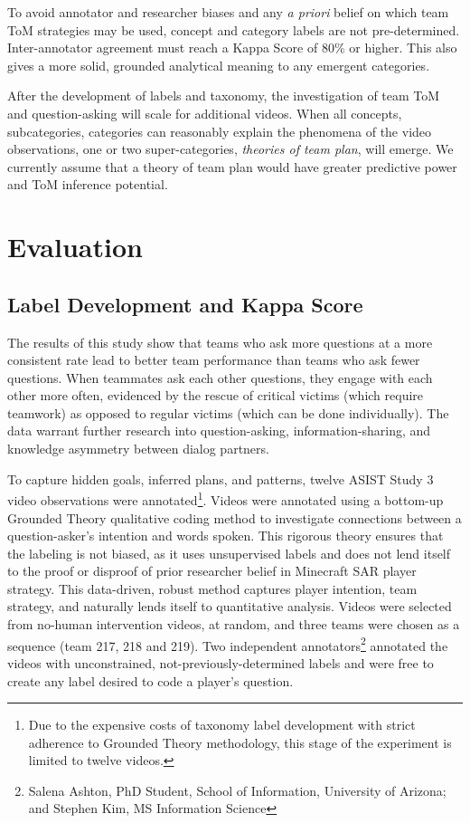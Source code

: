 To avoid annotator and researcher biases and any \emph{a priori} belief on
which team ToM strategies may be used, concept and category labels are not
pre-determined. Inter-annotator agreement must reach a Kappa Score of 80\% or
higher. This also gives a more solid, grounded analytical meaning to any
emergent categories. 

After the development of labels and taxonomy, the investigation of team ToM and
question-asking will scale for additional videos. When all concepts,
subcategories, categories can reasonably explain the phenomena of the video
observations, one or two super-categories, \emph{theories of team plan}, will
emerge. We currently assume that a theory of team plan would have greater
predictive power and ToM inference potential. 






\section{Evaluation}
\subsection{Label Development and Kappa Score}
The results of this study show that teams who ask more questions at a more consistent rate lead to better team performance than teams who ask fewer questions. When teammates ask each other questions, they engage with each other more often, evidenced by the rescue of critical victims (which require teamwork) as opposed to regular victims (which can be done individually). The data warrant further research into question-asking, information-sharing, and knowledge asymmetry between dialog partners.

To capture hidden goals, inferred plans, and patterns, twelve ASIST Study 3 video observations were annotated\footnote{Due to the expensive costs of taxonomy label development with strict adherence to Grounded Theory methodology, this stage of the experiment is limited to twelve videos.}. Videos were annotated using a bottom-up Grounded Theory qualitative coding method to investigate connections between a question-asker's intention and words spoken. This rigorous theory ensures that the labeling is not biased, as it uses unsupervised labels and does not lend itself to the proof or disproof of prior researcher
belief in Minecraft SAR player strategy. This data-driven, robust method captures player intention, team strategy, and naturally lends itself to
quantitative analysis. Videos were selected from no-human intervention videos, at random, and three teams were chosen as a sequence (team 217, 218 and 219).
Two independent annotators\footnote{Salena Ashton, PhD Student, School of Information, University of Arizona; and Stephen Kim, MS Information Science} annotated the videos with unconstrained, not-previously-determined labels and were free to create any label desired to code a
player's question.

